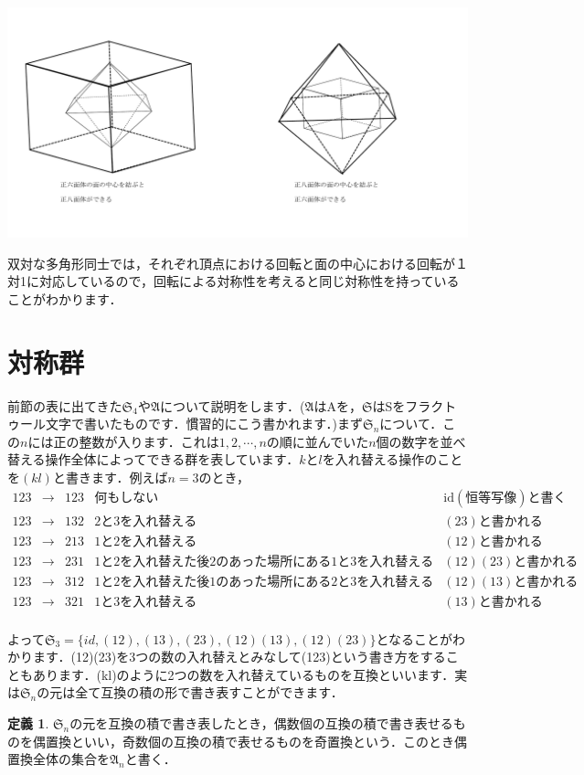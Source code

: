 \documentclass{jreport}
\theoremstyle{definition} %
\newtheorem{idefi}{定義}[section]
\begin{document}
\includegraphics[width=18cm]{Inoue_image/i2.pdf}

双対な多角形同士では，それぞれ頂点における回転と面の中心における回転が１対1に対応しているので，回転による対称性を考えると同じ対称性を持っていることがわかります．
\section{対称群}
前節の表に出てきた$\mathfrak{S}_4$や$\mathfrak{A}$について説明をします．($\mathfrak{A}$はAを，$\mathfrak{S}$はSをフラクトゥール文字で書いたものです．慣習的にこう書かれます．)まず$\mathfrak{S}_n$について．この$n$には正の整数が入ります．これは$1,2,\cdots,n$の順に並んでいた$n$個の数字を並べ替える操作全体によってできる群を表しています．$k$と$l$を入れ替える操作のことを$(kl)$と書きます．例えば$n=3$のとき，
\[ %
  \begin{array}{cccll}
    123&\rightarrow&123&何もしない&\mathrm{id} (恒等写像)と書く\\
    123&\rightarrow&132&2と3を入れ替える&(23)と書かれる\\
    123&\rightarrow&213&1と2を入れ替える&(12)と書かれる\\
    123&\rightarrow&231&1と2を入れ替えた後2のあった場所にある1と3を入れ替える&(12)(23)と書かれる\\
    123&\rightarrow&312&1と2を入れ替えた後1のあった場所にある2と3を入れ替える&(12)(13)と書かれる\\
    123&\rightarrow&321&1と3を入れ替える&(13)と書かれる\\
  \end{array}
\]

よって$\mathfrak{S}_3=\{id,(12),(13),(23),(12)(13),(12)(23)\}$となることがわかります．(12)(23)を3つの数の入れ替えとみなして(123)という書き方をすることもあります．(kl)のように2つの数を入れ替えているものを互換といいます．実は$\mathfrak{S}_n$の元は全て互換の積の形で書き表すことができます．
\begin{idefi}
  $\mathfrak{S}_n$の元を互換の積で書き表したとき，偶数個の互換の積で書き表せるものを偶置換といい，奇数個の互換の積で表せるものを奇置換という．このとき偶置換全体の集合を$\mathfrak{A}_n$と書く．
\end{idefi}
\end{document}
